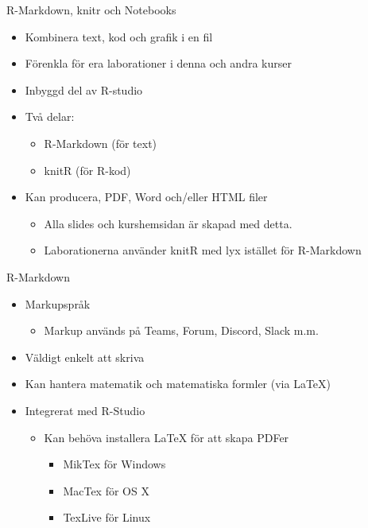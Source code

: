 \documentclass[
  11pt,
  ignorenonframetext,
  handout]{beamer}
\providecommand{\tightlist}{%
  \setlength{\itemsep}{0pt}\setlength{\parskip}{0pt}}
\begin{document}
\begin{frame}{R-Markdown, knitr och Notebooks}
\protect{}\label{r-markdown-knitr-och-notebooks-1}
\begin{itemize}
\tightlist
\item
  Kombinera text, kod och grafik i en fil
\item
  Förenkla för era laborationer i denna och andra kurser
\item
  Inbyggd del av R-studio
\item
  Två delar:

  \begin{itemize}
  \tightlist
  \item
    R-Markdown (för text)
  \item
    knitR (för R-kod)
  \end{itemize}
\item
  Kan producera, PDF, Word och/eller HTML filer

  \begin{itemize}
  \tightlist
  \item
    Alla slides och kurshemsidan är skapad med detta.
  \item
    Laborationerna använder knitR med lyx istället för R-Markdown
  \end{itemize}
\end{itemize}
\end{frame}

\begin{frame}{R-Markdown}
\protect{}\label{r-markdown}
\begin{itemize}
\tightlist
\item
  Markupspråk

  \begin{itemize}
  \tightlist
  \item
    Markup används på Teams, Forum, Discord, Slack m.m.
  \end{itemize}
\item
  Väldigt enkelt att skriva
\item
  Kan hantera matematik och matematiska formler (via LaTeX)
\item
  Integrerat med R-Studio

  \begin{itemize}
  \tightlist
  \item
    Kan behöva installera LaTeX för att skapa PDFer

    \begin{itemize}
    \tightlist
    \item
      MikTex för Windows
    \item
      MacTex för OS X
    \item
      TexLive för Linux
    \end{itemize}
  \end{itemize}
\end{itemize}
\end{frame}
\end{document}
